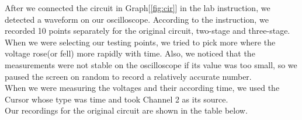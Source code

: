 \hfill \newline
\phantom{ } After we connected the circuit in Graph[\ref{fig:cir}] in the lab instruction, we detected a waveform on our oscilloscope. According to the instruction, we recorded 10 points separately for the original circuit, two-stage and three-stage. When we were selecting our testing points, we tried to pick more where the voltage rose(or fell) more rapidly with time. Also, we noticed that the measurements were not stable on the oscilloscope if its value was too small, so we paused the screen on random to record a relatively accurate number.\\
\phantom{ } When we were measuring the voltages and their according time, we used the Cursor whose type was time and took Channel 2 as its source.\\
\phantom{ } Our recordings for the original circuit are shown in the table below.

